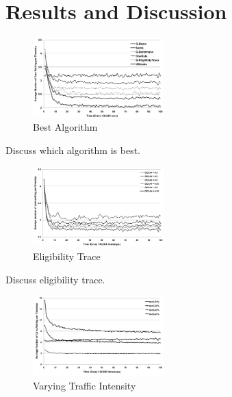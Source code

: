 \section{Results and Discussion}

\begin{description}



\begin{figure}
\centering
\includegraphics[width=0.45\textwidth]{algorithm}
\caption{Best Algorithm}\label{f:algorithm}
\end{figure}

\item[Fig.~\ref{f:algorithm}]
Discuss which algorithm is best.




\begin{figure}
\centering
\includegraphics[width=0.45\textwidth]{eligibility}
\caption{Eligibility Trace}\label{f:eligibility}
\end{figure}

\item[Fig.~\ref{f:eligibility}]
Discuss eligibility trace.




\begin{figure}
\centering
\includegraphics[width=0.45\textwidth]{intensity}
\caption{Varying Traffic Intensity}\label{f:intensity}
\end{figure}


\end{description}
